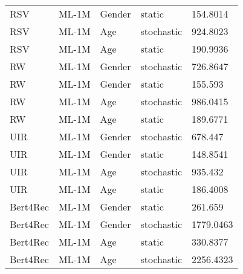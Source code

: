 \begin{center}
\begin{longtable}{|l|l|l|l|l|}
RSV&ML-1M&Gender&static&154.8014\\
RSV&ML-1M&Age&stochastic&924.8023\\
RSV&ML-1M&Age&static&190.9936\\
RW&ML-1M&Gender&stochastic&726.8647\\
RW&ML-1M&Gender&static&155.593\\
RW&ML-1M&Age&stochastic&986.0415\\
RW&ML-1M&Age&static&189.6771\\
UIR&ML-1M&Gender&stochastic&678.447\\
UIR&ML-1M&Gender&static&148.8541\\
UIR&ML-1M&Age&stochastic&935.432\\
UIR&ML-1M&Age&static&186.4008\\
Bert4Rec&ML-1M&Gender&static&261.659\\
Bert4Rec&ML-1M&Gender&stochastic&1779.0463\\
Bert4Rec&ML-1M&Age&static&330.8377\\
Bert4Rec&ML-1M&Age&stochastic&2256.4323\\      
\hline
\end{longtable}
\end{center}
